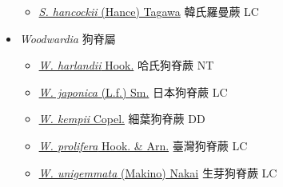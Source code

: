 \begin{itemize}
  \begin{itemize}
        \item[] \href{http://www.theplantlist.org/tpl1.1/search?q=Struthiopteris+hancockii}{\textit{S. hancockii} (Hance) Tagawa}   韓氏羅曼蕨   LC
  \end{itemize}
 \item[    ] \textit{Woodwardia} 狗脊屬
                                
  \begin{itemize}
        \item[] \href{http://www.theplantlist.org/tpl1.1/search?q=Woodwardia+harlandii}{\textit{W. harlandii} Hook.}   哈氏狗脊蕨   NT
        \item[] \href{http://www.theplantlist.org/tpl1.1/search?q=Woodwardia+japonica}{\textit{W. japonica} (L.f.) Sm.}   日本狗脊蕨   LC
        \item[] \href{http://www.theplantlist.org/tpl1.1/search?q=Woodwardia+kempii}{\textit{W. kempii} Copel.}   細葉狗脊蕨   DD
        \item[] \href{http://www.theplantlist.org/tpl1.1/search?q=Woodwardia+prolifera}{\textit{W. prolifera} Hook. \& Arn.}   臺灣狗脊蕨   LC
        \item[] \href{http://www.theplantlist.org/tpl1.1/search?q=Woodwardia+unigemmata}{\textit{W. unigemmata} (Makino) Nakai}   生芽狗脊蕨   LC
  \end{itemize}
  \end{itemize}
